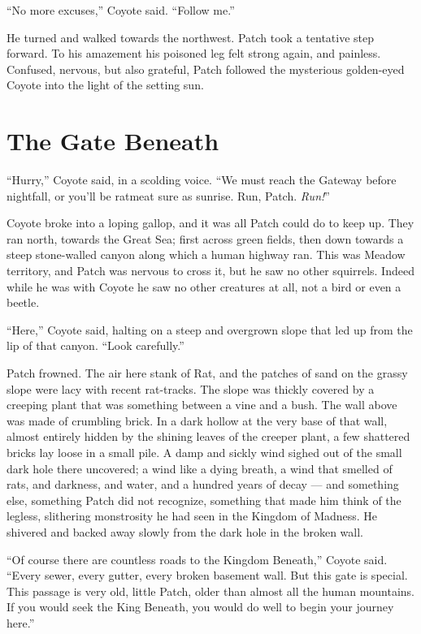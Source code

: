 \documentclass[12pt]{memoir}
\begin{document}
“No more excuses,” Coyote said. “Follow me.”

He turned and walked towards the northwest. Patch took a tentative
step forward. To his amazement his poisoned leg felt strong again, and
painless. Confused, nervous, but also grateful, Patch followed the
mysterious golden-eyed Coyote into the light of the setting sun.


\section{The Gate Beneath}

“Hurry,” Coyote said, in a scolding voice. “We must reach the Gateway
before nightfall, or you’ll be ratmeat sure as sunrise. Run,
Patch. \textit{Run!}”

Coyote broke into a loping gallop, and it was all Patch could do to
keep up. They ran north, towards the Great Sea; first across green
fields, then down towards a steep stone-walled canyon along which a
human highway ran. This was Meadow territory, and Patch was nervous to
cross it, but he saw no other squirrels. Indeed while he was with
Coyote he saw no other creatures at all, not a bird or even a beetle.

“Here,” Coyote said, halting on a steep and overgrown slope that led
up from the lip of that canyon. “Look carefully.”

Patch frowned. The air here stank of Rat, and the patches of sand on
the grassy slope were lacy with recent rat-tracks. The slope was
thickly covered by a creeping plant that was something between a vine
and a bush. The wall above was made of crumbling brick. In a dark
hollow at the very base of that wall, almost entirely hidden by the
shining leaves of the creeper plant, a few shattered bricks lay loose
in a small pile. A damp and sickly wind sighed out of the small dark
hole there uncovered; a wind like a dying breath, a wind that smelled
of rats, and darkness, and water, and a hundred years of decay — and
something else, something Patch did not recognize, something that made
him think of the legless, slithering monstrosity he had seen in the
Kingdom of Madness. He shivered and backed away slowly from the dark
hole in the broken wall.

“Of course there are countless roads to the Kingdom Beneath,” Coyote
said. “Every sewer, every gutter, every broken basement wall. But this
gate is special. This passage is very old, little Patch, older than
almost all the human mountains. If you would seek the King Beneath,
you would do well to begin your journey here.”
\end{document}
